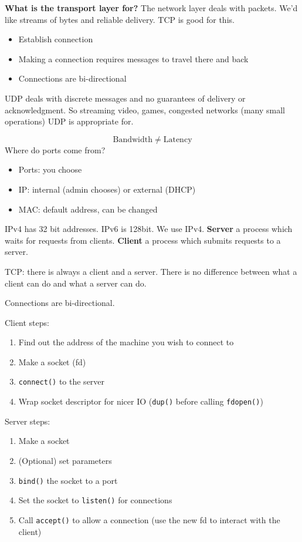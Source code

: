 \documentclass[10pt, a4paper]{article}
\begin{document}
\begin{multicols}{4}
    \textbf{What is the transport layer for?} The network layer deals with packets. We'd like streams of bytes and reliable delivery. TCP is good for this.
    \begin{itemize}
        \item Establish connection
        \item Making a connection requires messages to travel there and back
        \item Connections are bi-directional
    \end{itemize}
    UDP deals with discrete messages and no guarantees of delivery or acknowledgment. So streaming video, games, congested networks (many small operations) UDP is appropriate for.

    \[\mathrm{Bandwidth} \neq \mathrm{Latency}\]
    Where do ports come from?
    \begin{itemize}
        \item Ports: you choose
        \item IP: internal (admin chooses) or external (DHCP)
        \item MAC: default address, can be changed
    \end{itemize}
    IPv4 has 32 bit addresses. IPv6 is 128bit. We use IPv4.
    \textbf{Server} a process which waits for requests from  clients. \textbf{Client} a process which submits requests to a server.
    
    TCP: there is always a client and a server. There is no difference between what a client can do and what a server can do.

    Connections are bi-directional.

    Client steps:
    \begin{enumerate}
        \item Find out the address of the machine you wish to connect to
        \item Make a socket (fd)
        \item \texttt{connect()} to the server
        \item Wrap socket descriptor for nicer IO (\texttt{dup()} before calling \texttt{fdopen()})
    \end{enumerate}

    Server steps:
    \begin{enumerate}
        \item Make a socket
        \item (Optional) set parameters
        \item \texttt{bind()} the socket to a port
        \item Set the socket to \texttt{listen()} for connections
        \item Call \texttt{accept()} to allow a connection (use the new fd to interact with the client)
    \end{enumerate}


\end{multicols}
\end{document}
